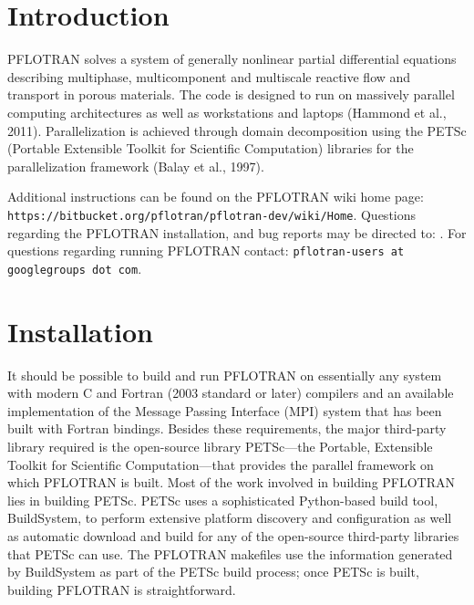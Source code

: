 \documentclass[12pt]{article}
\begin{document}
\normalsize

\clearpage

\tableofcontents

\listoffigures

\listoftables

\clearpage

\section{Introduction}

PFLOTRAN solves a system of generally nonlinear partial differential equations describing multiphase, multicomponent and multiscale reactive flow and transport in porous materials. The code is designed to run on massively parallel computing architectures as well as workstations and laptops (Hammond et al., 2011). Parallelization is achieved through domain decomposition using the PETSc (Port\-a\-ble Extensible Toolkit for Scientific Computation) libraries for the parallelization framework  (Balay et al., 1997).

Additional instructions can be found on the PFLOTRAN wiki home page: \linebreak \verb|https://bitbucket.org/pflotran/pflotran-dev/wiki/Home|.
Questions regarding the PFLOTRAN installation, and bug reports may be directed to: .
For questions regarding running PFLOTRAN contact: {\tt pflotran-users at googlegroups dot com}.

\section{Installation}

\setcounter{equation}{0}

It should be possible to build and run PFLOTRAN on essentially any system with 
modern C and Fortran (2003 standard or later) compilers and an available 
implementation of the Message Passing Interface (MPI) system that has been 
built with Fortran bindings.
Besides these requirements, the major third-party library required is 
the open-source library PETSc---the Portable, Extensible Toolkit for Scientific 
Computation---that provides the parallel framework on which PFLOTRAN is 
built.
Most of the work involved in building PFLOTRAN lies in building PETSc. 
PETSc uses a sophisticated Python-based build tool, BuildSystem, to perform 
extensive platform discovery and configuration as well as automatic download 
and build for any of the open-source third-party libraries that PETSc can 
use. 
The PFLOTRAN makefiles use the information generated by BuildSystem as part 
of the PETSc build process; once PETSc is built, building PFLOTRAN is  
straightforward.
\end{document}
